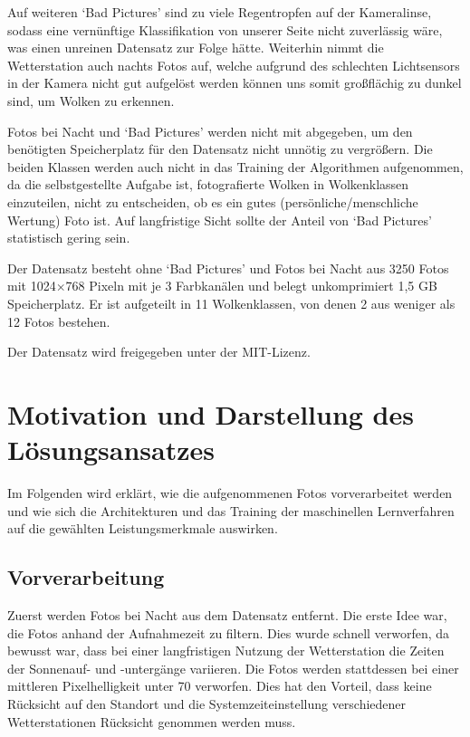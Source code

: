 Auf weiteren `Bad Pictures' sind zu
viele Regentropfen auf der Kameralinse, sodass eine vernünftige
Klassifikation von unserer Seite nicht zuverlässig wäre,
was einen unreinen Datensatz zur Folge hätte.
Weiterhin nimmt die Wetterstation auch nachts Fotos auf, welche aufgrund
des schlechten Lichtsensors in der Kamera nicht gut aufgelöst werden
können uns somit großflächig zu dunkel sind, um Wolken zu erkennen.

Fotos bei Nacht und `Bad Pictures' werden nicht mit abgegeben, um den
benötigten Speicherplatz für den Datensatz nicht unnötig zu vergrößern.
Die beiden Klassen werden auch nicht in das Training der Algorithmen
aufgenommen, da die selbstgestellte Aufgabe ist, fotografierte Wolken in
Wolkenklassen einzuteilen, nicht zu entscheiden, ob es ein gutes
(persönliche/menschliche Wertung) Foto ist. Auf langfristige Sicht
sollte der Anteil von `Bad Pictures' statistisch gering sein.

Der Datensatz besteht ohne `Bad Pictures' und Fotos bei Nacht aus 3250
Fotos mit 1024$\times$768 Pixeln mit je 3 Farbkanälen und belegt unkomprimiert
1,5 GB Speicherplatz. Er ist aufgeteilt in 11 Wolkenklassen, von denen 2
aus weniger als 12 Fotos bestehen.

Der Datensatz wird freigegeben unter der MIT-Lizenz.

\hypertarget{motivation-und-darstellung-des-luxf6sungsansatzes}{%
\section{Motivation und Darstellung des
Lösungsansatzes}\label{motivation-und-darstellung-des-luxf6sungsansatzes}}

Im Folgenden wird erklärt, wie die aufgenommenen Fotos vorverarbeitet
werden und wie sich die Architekturen und das Training der maschinellen
Lernverfahren auf die gewählten Leistungsmerkmale auswirken.

\hypertarget{vorverarbeitung}{%
\subsection{Vorverarbeitung}\label{vorverarbeitung}}

Zuerst werden Fotos bei Nacht aus dem Datensatz entfernt. Die erste Idee
war, die Fotos anhand der Aufnahmezeit zu filtern. Dies wurde schnell
verworfen, da bewusst war, dass bei einer langfristigen Nutzung der
Wetterstation die Zeiten der Sonnenauf- und -untergänge variieren. Die
Fotos werden stattdessen bei einer mittleren Pixelhelligkeit unter 70
verworfen. Dies hat den Vorteil, dass keine Rücksicht auf den Standort
und die Systemzeiteinstellung verschiedener Wetterstationen Rücksicht
genommen werden muss.

